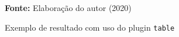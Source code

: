 \begin{figure}[ht!]
\centering

\caption{\textmd{Exemplo de resultado com uso do plugin \texttt{table}}}
\label{fig:tableeditorres}

\par\medskip\textbf{Fonte:} Elaboração do autor (2020) \par\medskip

\end{figure}

